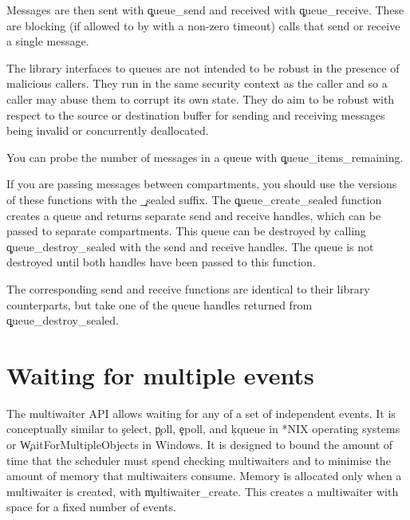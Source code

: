 
Messages are then sent with \c{queue_send} and received with \c{queue_receive}.
These are blocking (if allowed to by with a non-zero timeout) calls that send or receive a single message.



\begin{caution}
The library interfaces to queues are not intended to be robust in the presence of malicious callers.
They run in the same security context as the caller and so a caller may abuse them to corrupt its own state.
They do aim to be robust with respect to the source or destination buffer for sending and receiving messages being invalid or concurrently deallocated.
\end{caution}

You can probe the number of messages in a queue with \c{queue_items_remaining}.


If you are passing messages between compartments, you should use the versions of these functions with the \c{_sealed} suffix.
The \c{queue_create_sealed} function creates a queue and returns separate send and receive handles, which can be passed to separate compartments.
This queue can be destroyed by calling \c{queue_destroy_sealed} with the send and receive handles.
The queue is not destroyed until both handles have been passed to this function.



The corresponding send and receive functions are identical to their library counterparts, but take one of the queue handles returned from \c{queue_destroy_sealed}.

\section[label=multiwaiter]{Waiting for multiple events}

The multiwaiter API allows waiting for any of a set of independent events.
It is conceptually similar to \c{select}, \c{poll}, \c{epoll}, and \c{kqueue} in *NIX operating systems or \c{WaitForMultipleObjects} in Windows.
It is designed to bound the amount of time that the scheduler must spend checking multiwaiters and to minimise the amount of memory that multiwaiters consume.
Memory is allocated only when a multiwaiter is created, with \c{multiwaiter_create}.
This creates a multiwaiter with space for a fixed number of events.

